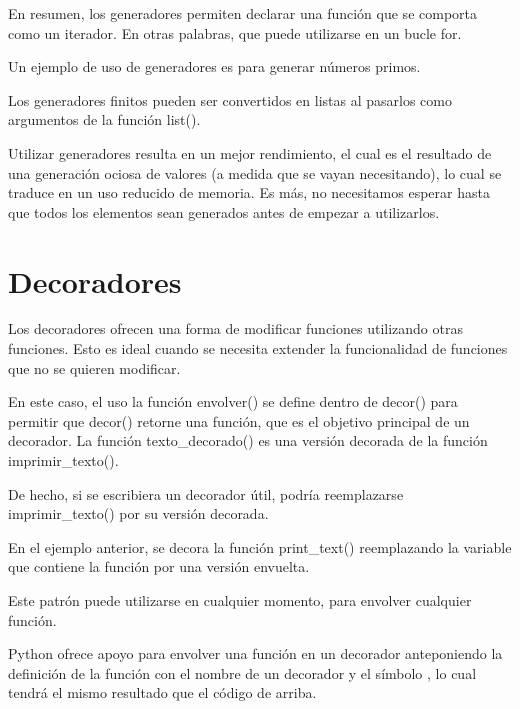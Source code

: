 \documentclass{report}
\begin{document}

En resumen, los generadores permiten declarar una función que se comporta como un iterador. En otras palabras, que puede utilizarse en un bucle for.

Un ejemplo de uso de generadores es para generar números primos.


Los generadores finitos pueden ser convertidos en listas al pasarlos como argumentos de la función list().


Utilizar generadores resulta en un mejor rendimiento, el cual es el resultado de una generación ociosa de valores (a medida que se vayan necesitando), lo cual se traduce en un uso reducido de memoria. Es más, no necesitamos esperar hasta que todos los elementos sean generados antes de empezar a utilizarlos.

\section{Decoradores}

Los decoradores ofrecen una forma de modificar funciones utilizando otras funciones. Esto es ideal cuando se necesita extender la funcionalidad de funciones que no se quieren modificar.


En este caso, el uso la función envolver() se define dentro de decor() para permitir que decor() retorne una función, que es el objetivo principal de un decorador. La función texto\_decorado() es una versión decorada de la función imprimir\_texto().

De hecho, si se escribiera un decorador útil, podría reemplazarse imprimir\_texto() por su versión decorada.


En el ejemplo anterior, se decora la función print\_text() reemplazando la variable que contiene la función por una versión envuelta.


Este patrón puede utilizarse en cualquier momento, para envolver cualquier función.

Python ofrece apoyo para envolver una función en un decorador anteponiendo la definición de la función con el nombre de un decorador y el símbolo \@, lo cual tendrá el mismo resultado que el código de arriba.
\end{document}
